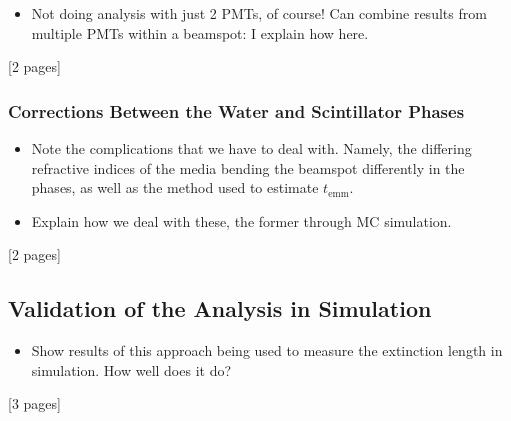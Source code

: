 {
\color{blue}
\begin{itemize}
    \item Not doing analysis with just 2 PMTs, of course! Can combine results from multiple PMTs within a beamspot: I explain how here.
\end{itemize}
[2 pages]

\subsubsection{Corrections Between the Water and Scintillator Phases}\label{sec:smellie_ext_corrections}
\begin{itemize}
    \item Note the complications that we have to deal with. Namely, the differing refractive indices of the media bending the beamspot differently in the phases, as well as the method used to estimate $t_{\textrm{emm}}$.
    \item Explain how we deal with these, the former through MC simulation.
\end{itemize}
[2 pages]
\subsection{Validation of the Analysis in Simulation}
\begin{itemize}
    \item Show results of this approach being used to measure the extinction length in simulation. How well does it do?
\end{itemize}
[3 pages]
}
